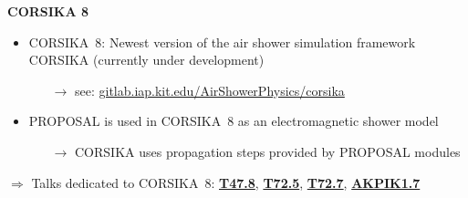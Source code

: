 \begin{frame}[c]
    \begin{columns}[onlytextwidth]
    \begin{column}{0.6\textwidth}
    \textbf{CORSIKA 8}
        \begin{itemize}
            \item CORSIKA~8: Newest version of the air shower simulation framework CORSIKA (currently under development)
            \begin{itemize}
                \item[$\rightarrow$] see: \url{gitlab.iap.kit.edu/AirShowerPhysics/corsika}
            \end{itemize}
            \item PROPOSAL is used in CORSIKA~8 as an electromagnetic shower model
            \begin{itemize}
                \item[$\rightarrow$] CORSIKA uses propagation steps provided by PROPOSAL modules
            \end{itemize}
        \end{itemize}

        \hspace{10pt} $\Rightarrow$ Talks dedicated to CORSIKA~8: \href{https://www.dpg-verhandlungen.de/year/2022/conference/heidelberg/part/t/session/47/contribution/8}{\textbf{T47.8}}, \href{https://www.dpg-verhandlungen.de/year/2022/conference/heidelberg/part/t/session/72/contribution/5}{\textbf{T72.5}}, \href{https://www.dpg-verhandlungen.de/year/2022/conference/heidelberg/part/t/session/72/contribution/7}{\textbf{T72.7}}, \href{https://www.dpg-verhandlungen.de/year/2022/conference/heidelberg/part/akpik/session/1/contribution/7}{\textbf{AKPIK1.7}}


\end{column}
\end{columns}
\end{frame}

